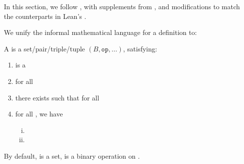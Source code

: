 
In this section, we follow \cite{jadczyk2019notes}, with supplements from \cite{garling2011clifford, chen2016infinitely}, 
and modifications to match the counterparts in Lean's \Mathlib.

\begin{remark}
\label{mk:Informal}

We unify the informal mathematical language for a definition to:

A  is a set/pair/triple/tuple $(B, \mathtt{op}, ...)$, satisfying:

\begin{enumerate}
    \item {} is a  

    \item {} for all  
    
    \item {}
    there exists  such that
     for all 

    \item {}for all , we have

        \begin{enumerate}[(i)]

        \item {}
        \item {}
        
        \end{enumerate}


\end{enumerate}

By default,  is a set,  is a binary operation on .

\end{remark}

